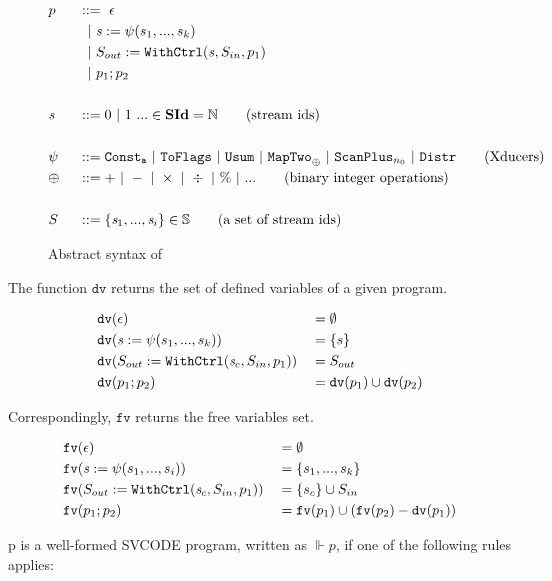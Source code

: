 \begin{figure}[H] \large
	\begin{alignat*}{2}
	&p  && :: = \ \epsilon \\ 
	&   &&\ \ | \ \mathit{s} := \psi(s_1,...,s_k) \\
	&   &&\ \ | \ S_{out} := \mathtt{WithCtrl}(\mathit{s},S_{in},p_1) \\
	&   &&\ \ | \ p_1;p_2  \\
	\\
	&\mathit{s} && ::= 0 \ | \ 1 \ ... \in \mathbf{SId}  = \mathbb{N}   \tag{stream ids}\\
	\\
	& \psi \ && ::= \mathtt{Const_{a}} \ | \ \mathtt{ToFlags}  
	\ | \ \mathtt{Usum} \ | \ \mathtt{MapTwo}_{\oplus} \ | \ \mathtt{ScanPlus}_{n_0} \ | \ \mathtt{Distr}  \tag{Xducers} \\
	& \oplus \ && :: = + \ | \ - \ | \ \times \ | \ \div \ | \ \% \ | \ ...  \tag{binary integer operations}\\
	\\
	&  S && ::= \{\mathit{s}_1,..., \mathit{s}_i\} \in \mathbb{S}  \tag{a set of stream ids}
	\end{alignat*}
	\caption{Abstract syntax of \fmsvcode \label{fig-svcode-grammar}}
\end{figure}


The function $\texttt{dv}$ returns the set of defined variables of a given \fmsvcode program.

\begin{alignat*}{2}
&\mathtt{dv}(\epsilon) && =  \emptyset \\
&\mathtt{dv}(\mathit{s} := \psi(s_1,...,s_k)) && =  \{s\} \\
&\mathtt{dv}(S_{out} := \mathtt{WithCtrl}(\mathit{s}_c,S_{in},p_1)) && =   S_{out} \\
&\mathtt{dv}(p_1;p_2) && =  \mathtt{dv}(p_1) \cup \mathtt{dv}(p_2) \\
\end{alignat*}

Correspondingly, $\texttt{fv}$ returns the free variables set.

\begin{alignat*}{2}
&\mathtt{fv}(\epsilon) && = \emptyset \\
&\mathtt{fv}(\mathit{s} := \psi(s_1,...,s_i)) && = \{s_1,...,s_k\}\\
&\mathtt{fv}(S_{out} := \mathtt{WithCtrl}(\mathit{s}_c,S_{in},p_1)) && = \{s_c\} \cup S_{in} \\
&\mathtt{fv}(p_1;p_2) && = \mathtt{fv}(p_1) \cup (\mathtt{fv}(p_2) - \mathtt{dv}(p_1)) \\
\end{alignat*}


\begin{defi}
	p is a well-formed SVCODE program, written as $\Vdash p$, if one of the following rules applies:
\end{defi}
	
